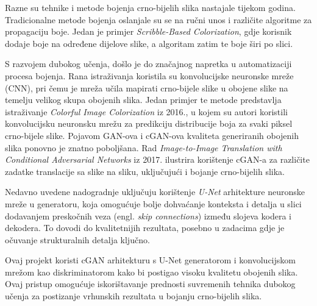 Razne su tehnike i metode bojenja crno-bijelih slika nastajale tijekom godina. Tradicionalne metode bojenja oslanjale su se na ručni unos i različite algoritme za propagaciju boje. Jedan je primjer \textit{Scribble-Based Colorization}\cite{li2018overview}, gdje korisnik dodaje boje na određene dijelove slike, a algoritam zatim te boje širi po slici.

S razvojem dubokog učenja, došlo je do značajnog napretka u automatizaciji procesa bojenja. Rana istraživanja koristila su konvolucijske neuronske mreže (CNN), pri čemu je mreža učila mapirati crno-bijele slike u obojene slike na temelju velikog skupa obojenih slika. Jedan primjer te metode predstavlja istraživanje \textit{Colorful Image Colorization}\cite{zhang2016colorful} iz 2016., u kojem su autori koristili konvolucijsku neuronsku mrežu za predikciju distribucije boja za svaki piksel crno-bijele slike. Pojavom GAN-ova i cGAN-ova kvaliteta generiranih obojenih slika ponovno je znatno poboljšana. Rad \textit{Image-to-Image Translation with Conditional Adversarial Networks}\cite{isola2018imagetoimage} iz 2017. ilustrira korištenje cGAN-a za različite zadatke translacije sa slike na sliku, uključujući i bojanje crno-bijelih slika.

Nedavno uvedene nadogradnje uključuju korištenje \textit{U-Net} arhitekture neuronske mreže u generatoru, koja omogućuje bolje dohvaćanje konteksta i detalja u slici dodavanjem preskočnih veza (engl. \textit{skip connections}) između slojeva kodera i dekodera. To dovodi do kvalitetnijih rezultata, posebno u zadacima gdje je očuvanje strukturalnih detalja ključno.

Ovaj projekt koristi cGAN arhitekturu s U-Net generatorom i konvolucijskom mrežom kao diskriminatorom kako bi postigao visoku kvalitetu obojenih slika. Ovaj pristup omogućuje iskorištavanje prednosti suvremenih tehnika dubokog učenja za postizanje vrhunskih rezultata u bojanju crno-bijelih slika.
